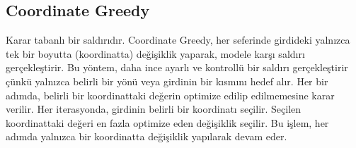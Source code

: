\newpage

\subsection{Coordinate Greedy}

Karar tabanlı bir saldırıdır. Coordinate Greedy, her seferinde girdideki yalnızca tek bir boyutta (koordinatta) değişiklik yaparak, modele karşı saldırı gerçekleştirir. Bu yöntem, daha ince ayarlı ve kontrollü bir saldırı gerçekleştirir çünkü yalnızca belirli bir yönü veya girdinin bir kısmını hedef alır. Her bir adımda, belirli bir koordinattaki değerin optimize edilip edilmemesine karar verilir. Her iterasyonda, girdinin belirli bir koordinatı seçilir. Seçilen koordinattaki değeri en fazla optimize eden değişiklik seçilir. Bu işlem, her adımda yalnızca bir koordinatta değişiklik yapılarak devam eder.

\newpage